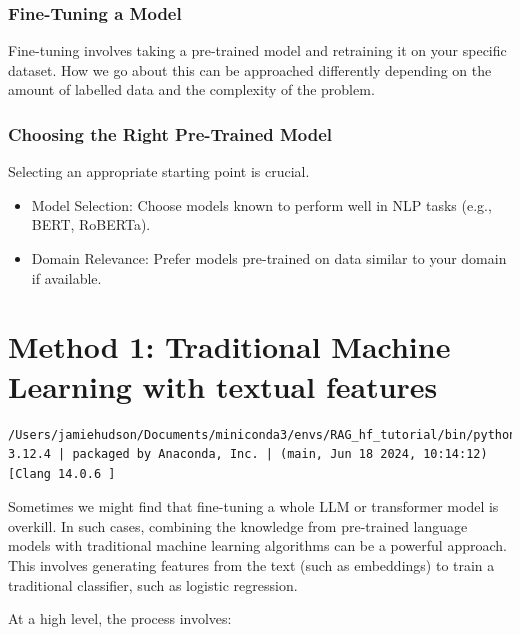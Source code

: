 \documentclass[
  letterpaper,
  DIV=11,
  numbers=noendperiod]{scrreprt}
\providecommand{\tightlist}{%
  \setlength{\itemsep}{0pt}\setlength{\parskip}{0pt}}\usepackage{longtable,booktabs,array}
\begin{document}
\subsection{Fine-Tuning a Model}\label{fine-tuning-a-model}

Fine-tuning involves taking a pre-trained model and retraining it on
your specific dataset. How we go about this can be approached
differently depending on the amount of labelled data and the complexity
of the problem.

\subsection{Choosing the Right Pre-Trained
Model}\label{choosing-the-right-pre-trained-model}

Selecting an appropriate starting point is crucial.

\begin{itemize}
\tightlist
\item
  Model Selection: Choose models known to perform well in NLP tasks
  (e.g., BERT, RoBERTa).
\item
  Domain Relevance: Prefer models pre-trained on data similar to your
  domain if available.
\end{itemize}

\chapter{Method 1: Traditional Machine Learning with textual
features}\label{method-1-traditional-machine-learning-with-textual-features}

\begin{verbatim}
/Users/jamiehudson/Documents/miniconda3/envs/RAG_hf_tutorial/bin/python
3.12.4 | packaged by Anaconda, Inc. | (main, Jun 18 2024, 10:14:12) [Clang 14.0.6 ]
\end{verbatim}

Sometimes we might find that fine-tuning a whole LLM or transformer
model is overkill. In such cases, combining the knowledge from
pre-trained language models with traditional machine learning algorithms
can be a powerful approach. This involves generating features from the
text (such as embeddings) to train a traditional classifier, such as
logistic regression.

At a high level, the process involves:
\end{document}
